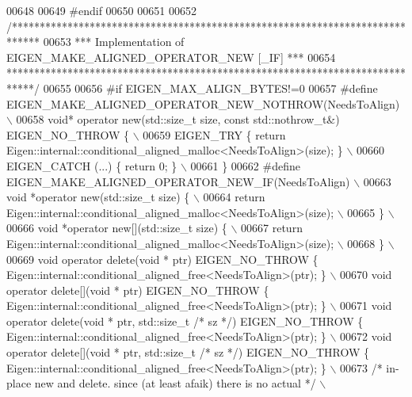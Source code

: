 \begin{DoxyCode}
00648     
00649 \textcolor{preprocessor}{#endif}
00650 
00651 
00652 \textcolor{comment}{/*****************************************************************************}
00653 \textcolor{comment}{*** Implementation of EIGEN\_MAKE\_ALIGNED\_OPERATOR\_NEW [\_IF]                ***}
00654 \textcolor{comment}{*****************************************************************************/}
00655 
00656 \textcolor{preprocessor}{#if EIGEN\_MAX\_ALIGN\_BYTES!=0}
00657 \textcolor{preprocessor}{  #define EIGEN\_MAKE\_ALIGNED\_OPERATOR\_NEW\_NOTHROW(NeedsToAlign) \(\backslash\)}
00658 \textcolor{preprocessor}{      void* operator new(std::size\_t size, const std::nothrow\_t&) EIGEN\_NO\_THROW \{ \(\backslash\)}
00659 \textcolor{preprocessor}{        EIGEN\_TRY \{ return Eigen::internal::conditional\_aligned\_malloc<NeedsToAlign>(size); \} \(\backslash\)}
00660 \textcolor{preprocessor}{        EIGEN\_CATCH (...) \{ return 0; \} \(\backslash\)}
00661 \textcolor{preprocessor}{      \}}
00662 \textcolor{preprocessor}{  #define EIGEN\_MAKE\_ALIGNED\_OPERATOR\_NEW\_IF(NeedsToAlign) \(\backslash\)}
00663 \textcolor{preprocessor}{      void *operator new(std::size\_t size) \{ \(\backslash\)}
00664 \textcolor{preprocessor}{        return Eigen::internal::conditional\_aligned\_malloc<NeedsToAlign>(size); \(\backslash\)}
00665 \textcolor{preprocessor}{      \} \(\backslash\)}
00666 \textcolor{preprocessor}{      void *operator new[](std::size\_t size) \{ \(\backslash\)}
00667 \textcolor{preprocessor}{        return Eigen::internal::conditional\_aligned\_malloc<NeedsToAlign>(size); \(\backslash\)}
00668 \textcolor{preprocessor}{      \} \(\backslash\)}
00669 \textcolor{preprocessor}{      void operator delete(void * ptr) EIGEN\_NO\_THROW \{
       Eigen::internal::conditional\_aligned\_free<NeedsToAlign>(ptr); \} \(\backslash\)}
00670 \textcolor{preprocessor}{      void operator delete[](void * ptr) EIGEN\_NO\_THROW \{
       Eigen::internal::conditional\_aligned\_free<NeedsToAlign>(ptr); \} \(\backslash\)}
00671 \textcolor{preprocessor}{      void operator delete(void * ptr, std::size\_t }\textcolor{comment}{/* sz */}\textcolor{preprocessor}{) EIGEN\_NO\_THROW \{
       Eigen::internal::conditional\_aligned\_free<NeedsToAlign>(ptr); \} \(\backslash\)}
00672 \textcolor{preprocessor}{      void operator delete[](void * ptr, std::size\_t }\textcolor{comment}{/* sz */}\textcolor{preprocessor}{) EIGEN\_NO\_THROW \{
       Eigen::internal::conditional\_aligned\_free<NeedsToAlign>(ptr); \} \(\backslash\)}
00673 \textcolor{preprocessor}{      }\textcolor{comment}{/* in-place new and delete. since (at least afaik) there is no actual   */}\textcolor{preprocessor}{ \(\backslash\)}

\end{DoxyCode}
